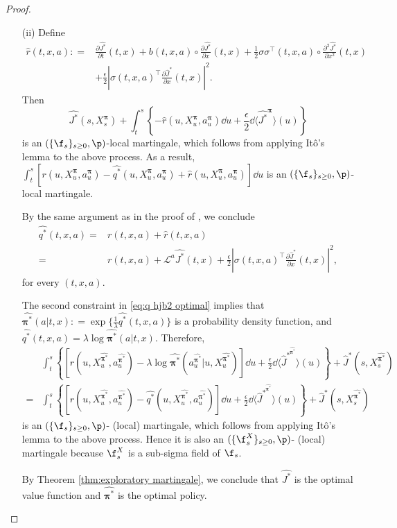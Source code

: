 \begin{proof}
\begin{enumerate}
\item[(ii)] Define 
\[\begin{aligned}
\hat r(t,x,a): = & \frac{\partial \widehat{J^*}}{\partial t}(t,x) + b(t,x,a)\circ \frac{\partial \widehat{J^*}}{\partial x}(t,x) + \frac{1}{2}\sigma\sigma^\top(t,x,a)\circ \frac{\partial^2 \widehat{J^*}}{\partial x^2}(t,x)\\
&  + \frac{\epsilon}{2}\left| \sigma(t,x,a)^\top \frac{\partial \widehat J^*}{\partial x}(t,x)\right|^2.
\end{aligned}\]
Then
\[ \widehat{J^*}(s,{X}_s^{\bm\pi}) + \int_t^s \left\{ -\hat r(u,{X}_{u}^{\bm\pi},a^{\bm\pi}_{u}) \dd u + \frac{\epsilon}{2}\dd \langle \widehat{J^*}^{\bm\pi} \rangle(u) \right\}\]
is an $(\{\f_s\}_{s\geq 0}, \p)$-local martingale, which follows from applying It\^o's lemma to the above process. As a result,
$\int_t^s [r(u,{X}_{u}^{\bm\pi},a^{\bm\pi}_{u}) - \widehat{q^*}(u,{X}_{u}^{\bm\pi},a^{\bm\pi}_{u}) + \hat r(u,{X}_{u}^{\bm\pi},a^{\bm\pi}_{u})  ]\dd u$ is an $(\{\f_s\}_{s\geq 0}, \p)$-local martingale. 

By the same argument as in the proof of \citet[Theorem 6]{jia2022q}, we conclude
\[\begin{aligned}
\widehat{q^*}(t,x,a) = & r(t,x,a) + \hat r(t,x,a)  \\
= & r(t,x,a) + \mathcal{L}^a \widehat{J^*}(t,x) + \frac{\epsilon}{2}\left| \sigma(t,x,a)^\top \frac{\partial \widehat J^*}{\partial x}(t,x)\right|^2,
\end{aligned}\]
for every $(t,x,a)$.


The second constraint in \eqref{eq:q hjb2 optimal} implies that $\widehat{\bm\pi^*}(a|t,x): = \exp\{  \frac{1}{\lambda}\widehat{q^*}(t,x,a) \}$ is a probability density function, and $\widehat{q^*}(t,x,a) = \lambda \log\widehat{\bm\pi^*}(a|t,x)$. Therefore,
\[\begin{aligned}
& \int_t^s \left\{ \left[ r(u, X_{u}^{\widehat{\bm\pi^*}}, a_{u}^{\widehat{\bm\pi^*}}) - \lambda\log\widehat{\bm\pi^*}(a_{u}^{\widehat{\bm\pi^*}}|u, X_{u}^{\widehat{\bm\pi^*}}) \right] \dd u + \frac{\epsilon}{2} \dd \langle  \widehat{J}^{*^{\widehat{\bm\pi^*}}} \rangle(u)\right\}+ \widehat{J}^*(s, X_s^{\widehat{\bm\pi^*}}) \\
= & \int_t^s \left\{ \left[ r(u, X_{u}^{\widehat{\bm\pi^*}}, a_{u}^{\widehat{\bm\pi^*}}) - \widehat{q^*}(u, X_{u}^{\widehat{\bm\pi^*}},a_{u}^{\widehat{\bm\pi^*}}) \right] \dd u + \frac{\epsilon}{2} \dd \langle  \widehat{J}^{*^{\widehat{\bm\pi^*}}} \rangle(u)\right\}+ \widehat{J}^*(s, X_s^{\widehat{\bm\pi^*}})
\end{aligned}  \]
is an $(\{\f_s \}_{s\geq 0},\p)$- (local) martingale, which follows from applying It\^o's lemma to the above process. Hence it is also an $(\{\f_s^X \}_{s\geq 0},\p)$- (local) martingale because $\f_s^X$ is a sub-sigma field of $\f_s$.

By Theorem \ref{thm:exploratory martingale}, we conclude that $\widehat{J^*}$ is the optimal value function and $\widehat{\bm\pi^*}$ is the optimal policy.
\end{enumerate}
\end{proof}


